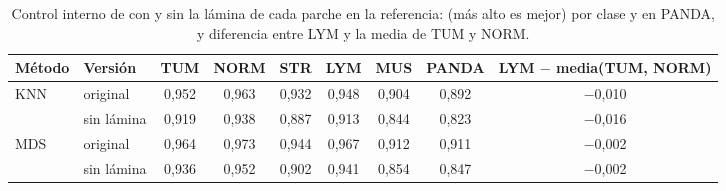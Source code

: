 \begin{table}[tbp]
\centering
\scriptsize
\setlength{\tabcolsep}{3pt}
\caption{Control interno de \nctcrc con y sin la lámina de cada parche en la referencia: \AUROC (más alto es mejor) por clase y en PANDA, y diferencia entre LYM y la media de TUM y NORM.}
\label{tab:fuga-control-interno}
\begin{tabular}{llccccccc}
\toprule
Método & Versión & TUM & NORM & STR & LYM & MUS & PANDA & LYM $-$ media(TUM, NORM) \\
\midrule
KNN & original & 0{,}952 & 0{,}963 & 0{,}932 & 0{,}948 & 0{,}904 & 0{,}892 & $-$0{,}010 \\
 & sin lámina & 0{,}919 & 0{,}938 & 0{,}887 & 0{,}913 & 0{,}844 & 0{,}823 & $-$0{,}016 \\
\midrule
MDS & original & 0{,}964 & 0{,}973 & 0{,}944 & 0{,}967 & 0{,}912 & 0{,}911 & $-$0{,}002 \\
 & sin lámina & 0{,}936 & 0{,}952 & 0{,}902 & 0{,}941 & 0{,}854 & 0{,}847 & $-$0{,}002 \\
\bottomrule
\end{tabular}
\end{table}
